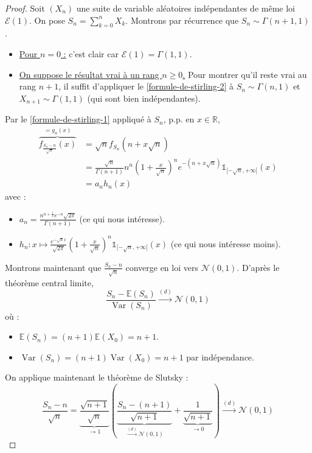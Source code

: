 	\begin{proof}
		Soit $(X_n)$ une suite de variable aléatoires indépendantes de même loi $\mathcal{E}(1)$. On pose $S_n = \sum_{k=0}^n X_k$. Montrons par récurrence que $S_n \sim \Gamma(n+1, 1)$.
		\begin{itemize}
			\item \uline{Pour $n = 0$ :} c'est clair car $\mathcal{E}(1) = \Gamma(1, 1)$.
			\item \uline{On suppose le résultat vrai à un rang $n \geq 0$.} Pour montrer qu'il reste vrai au rang $n+1$, il suffit d'appliquer le \cref{formule-de-stirling-2} à $S_n \sim \Gamma(n, 1)$ et $X_{n+1} \sim \Gamma(1, 1)$ (qui sont bien indépendantes).
		\end{itemize}
		Par le \cref{formule-de-stirling-1} appliqué à $S_n$, p.p. en $x \in \mathbb{R}$,
		\begin{align*}
			\overbrace{f_{\frac{S_n - n}{\sqrt{n}}}(x)}^{= g_n(x)} & = \sqrt{n} f_{S_n} (n + x \sqrt{n}) \\
			& = \frac{\sqrt{n}}{\Gamma(n+1)} n^n \left(1 + \frac{x}{\sqrt{n}} \right)^n e^{-(n + x\sqrt{n})} \mathbb{1}_{[-\sqrt{n}, +\infty[}(x) \\
			& = a_n h_n(x)
		\end{align*}
		avec :
		\begin{itemize}
			\item $a_n = \frac{n^{n+\frac{1}{2}} e^{-n} \sqrt{2 \pi}}{\Gamma(n+1)}$ (ce qui nous intéresse).
			\item $h_n : x \mapsto \frac{e^{-\sqrt{n} x}}{\sqrt{2\pi}} \left( 1 + \frac{x}{\sqrt{n}} \right)^n \mathbb{1}_{[-\sqrt{n}, +\infty[}(x)$ (ce qui nous intéresse moins).
		\end{itemize}
		\medskip
		Montrons maintenant que $\frac{S_n - n}{\sqrt{n}}$ converge en loi vers $\mathcal{N}(0,1)$. D'après le théorème central limite,
		\[ \frac{S_n - \mathbb{E}(S_n)}{\operatorname{Var}(S_n)} \overset{(d)}{\longrightarrow} \mathcal{N}(0,1) \]
		où :
		\begin{itemize}
			\item $\mathbb{E}(S_n) = (n+1) \mathbb{E}(X_0) = n+1$.
			\item $\operatorname{Var}(S_n) = (n+1) \operatorname{Var}(X_0) = n+1$ par indépendance.
		\end{itemize}
		On applique maintenant le théorème de Slutsky :
		\[ \frac{S_n - n}{\sqrt{n}} = \underbrace{\frac{\sqrt{n+1}}{\sqrt{n}}}_{\longrightarrow 1} \left( \underbrace{\frac{S_n - (n+1)}{\sqrt{n+1}}}_{\overset{(d)}{\longrightarrow} \mathcal{N}(0,1)} + \underbrace{\frac{1}{\sqrt{n+1}}}_{\longrightarrow 0} \right) \overset{(d)}{\longrightarrow} \mathcal{N}(0,1) \]

\end{proof}
